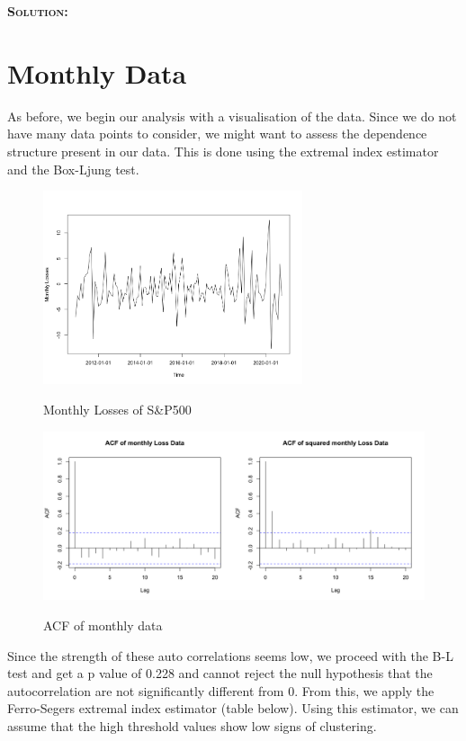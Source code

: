 \documentclass[12pt,oneside]{article}
\newenvironment{solution}
    {\textbf{\textsc{Solution:}}\\}
    {\newpage}
\begin{document}
\begin{solution}
\section*{Monthly Data}
As before, we begin our analysis with a visualisation of the data. Since we do not have many data points to consider, we might want to assess the dependence structure present in our data. This is done using the extremal index estimator and the Box-Ljung test.

\begin{figure}[H]
\begin{center}
{\includegraphics[width=3in]{Assignments/a4/month-data.png}}
\caption{Monthly Losses of S\&P500}
\end{center}
\end{figure}

\begin{figure}[H]
\begin{center}
{\includegraphics[width=4.5in]{Assignments/a4/mth-acf.png}}
\caption{ACF of monthly data}
\end{center}
\end{figure}
Since the strength of these auto correlations seems low, we proceed with the B-L test and get a p value of 0.228 and cannot reject the null hypothesis that the autocorrelation are not significantly different from 0. From this, we apply the Ferro-Segers extremal index estimator (table below). Using this estimator, we can assume that the high threshold values show low signs of clustering.


\end{solution}
\end{document}
